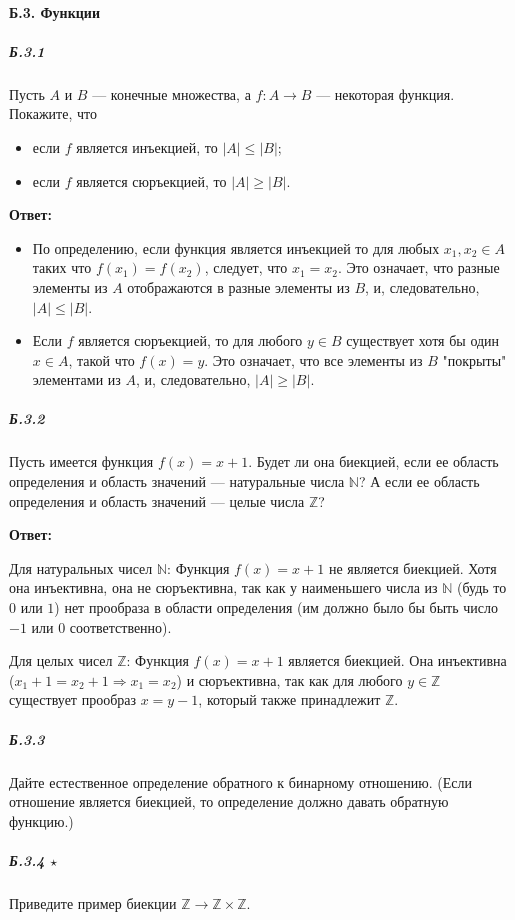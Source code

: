 \paragraph{Б.3. Функции}
\subparagraph{Б.3.1}
Пусть $A$ и $B$ — конечные множества, а $f : A \to B$ — некоторая функция. Покажите, что
\begin{itemize}
    \item[а.] если $f$ является инъекцией, то $|A| \le |B|$;
    \item[б.] если $f$ является сюръекцией, то $|A| \ge |B|$.
\end{itemize}

\textbf{Ответ:}
\begin{itemize}
    \item[а.] По определению, если функция является инъекцией то для любых $x_1, x_2 \in A$
    таких что $f(x_1) = f(x_2)$, следует, что $x_1 = x_2$. Это означает,
    что разные элементы из $A$ отображаются в разные элементы из $B$, и, следовательно, $|A| \le |B|$.
    \item[б.] Если $f$ является сюръекцией, то для любого $y \in B$ существует хотя бы один $x \in A$, такой что $f(x) = y$.
    Это означает, что все элементы из $B$ "покрыты" элементами из $A$, и, следовательно, $|A| \ge |B|$.
\end{itemize}

\subparagraph{Б.3.2}
Пусть имеется функция $f(x) = x + 1$. Будет ли она биекцией, 
если ее область определения и область значений — натуральные числа $\mathbb{N}$? 
А если ее область определения и область значений — целые числа $\mathbb{Z}$?

\textbf{Ответ:}

Для натуральных чисел $\mathbb{N}$: Функция $f(x) = x + 1$ не является биекцией.
Хотя она инъективна, она не сюръективна, так как у наименьшего числа из $\mathbb{N}$ (будь то $0$ или $1$) 
нет прообраза в области определения (им должно было бы быть число $-1$ или $0$ соответственно).

Для целых чисел $\mathbb{Z}$: Функция $f(x) = x + 1$ является биекцией.
Она инъективна ($x_1 + 1 = x_2 + 1 \Rightarrow x_1 = x_2$) и
сюръективна, так как для любого $y \in \mathbb{Z}$ существует прообраз $x = y - 1$, который также принадлежит $\mathbb{Z}$.

\subparagraph{Б.3.3}
Дайте естественное определение обратного к бинарному отношению. 
(Если отношение является биекцией, то определение должно давать обратную функцию.)

\subparagraph{Б.3.4 $\star$}
Приведите пример биекции $\mathbb{Z} \to \mathbb{Z} \times \mathbb{Z}$.